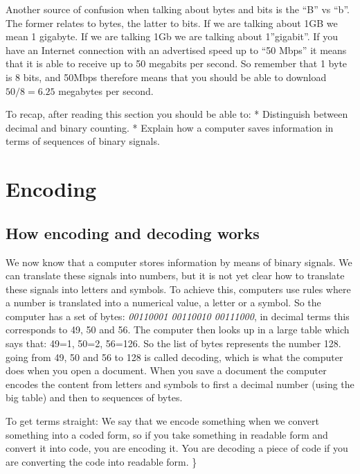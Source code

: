 \documentclass[
]{book}
\begin{document}
Another source of confusion when talking about bytes and bits is the ``B'' vs ``b''. The former relates to bytes, the latter to bits. If we are talking about 1GB we mean 1 gigabyte. If we are talking 1Gb we are talking about 1''gigabit''. If you have an Internet connection with an advertised speed up to ``50 Mbps'' it means that it is able to receive up to 50 megabits per second. So remember that 1 byte is 8 bits, and 50Mbps therefore means that you should be able to download \(50/8=6.25\) megabytes per second.

To recap, after reading this section you should be able to:
* Distinguish between decimal and binary counting.
* Explain how a computer saves information in terms of sequences of binary signals.

\hypertarget{encoding}{%
\section{Encoding}\label{encoding}}

\hypertarget{how-encoding-and-decoding-works}{%
\subsection*{How encoding and decoding works}\label{how-encoding-and-decoding-works}}

We now know that a computer stores information by means of binary signals. We can translate these signals into numbers, but it is not yet clear how to translate these signals into letters and symbols. To achieve this, computers use rules where a number is translated into a numerical value, a letter or a symbol. So the computer has a set of bytes: \emph{00110001 00110010 00111000}, in decimal terms this corresponds to 49, 50 and 56. The computer then looks up in a large table which says that: 49=1, 50=2, 56=126. So the list of bytes represents the number 128. going from 49, 50 and 56 to 128 is called decoding, which is what the computer does when you open a document. When you save a document the computer encodes the content from letters and symbols to first a decimal number (using the big table) and then to sequences of bytes.

To get terms straight: We say that we encode something when we convert something into a coded form, so if you take something in readable form and convert it into code, you are encoding it. You are decoding a piece of code if you are converting the code into readable form. \}
\end{document}
